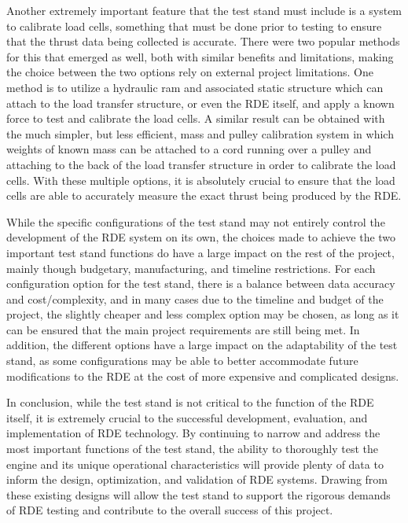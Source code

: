Another extremely important feature that the test stand must include is a system to calibrate load cells, something that must be done prior to testing to ensure that the thrust data being collected is accurate. There were two popular methods for this that emerged as well, both with similar benefits and limitations, making the choice between the two options rely on external project limitations. One method is to utilize a hydraulic ram and associated static structure which can attach to the load transfer structure, or even the RDE itself, and apply a known force to test and calibrate the load cells. A similar result can be obtained with the much simpler, but less efficient, mass and pulley calibration system in which weights of known mass can be attached to a cord running over a pulley and attaching to the back of the load transfer structure in order to calibrate the load cells. With these multiple options, it is absolutely crucial to ensure that the load cells are able to accurately measure the exact thrust being produced by the RDE.

While the specific configurations of the test stand may not entirely control the development of the RDE system on its own, the choices made to achieve the two important test stand functions do have a large impact on the rest of the project, mainly though budgetary, manufacturing, and timeline restrictions. For each configuration option for the test stand, there is a balance between data accuracy and cost/complexity, and in many cases due to the timeline and budget of the project, the slightly cheaper and less complex option may be chosen, as long as it can be ensured that the main project requirements are still being met. In addition, the different options have a large impact on the adaptability of the test stand, as some configurations may be able to better accommodate future modifications to the RDE at the cost of more expensive and complicated designs.

In conclusion, while the test stand is not critical to the function of the RDE itself, it is extremely crucial to the successful development, evaluation, and implementation of RDE technology. By continuing to narrow and address the most important functions of the test stand, the ability to thoroughly test the engine and its unique operational characteristics will provide plenty of data to inform the design, optimization, and validation of RDE systems. Drawing from these existing designs will allow the test stand to support the rigorous demands of RDE testing and contribute to the overall success of this project.